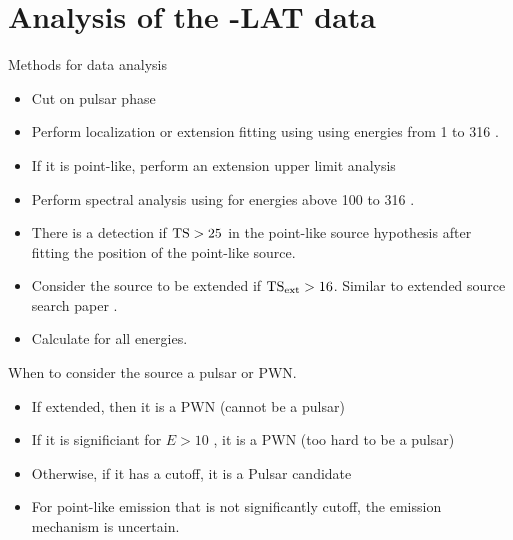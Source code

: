 \section{Analysis of the \fermi-LAT data}


Methods for data analysis
\begin{itemize}
\item Cut on pulsar phase
\item Perform localization or extension fitting using \gtlike using energies from 1 \gev to 316 \gev.
\item If it is point-like, perform an extension upper limit analysis 
\item Perform spectral analysis using \gtlike for energies above 100 \mev to 316 \gev.
\item There is a detection if  $\text{TS}>25$ in the point-like source hypothesis after fitting the position of the point-like source. 
\item Consider the source to be extended if $\text{TS}_\text{ext}>16$. Similar to extended source search paper .
\item Calculate \tscut for all energies.
\end{itemize}

When to consider the source a pulsar or PWN.
\begin{itemize}
  \item If extended, then it is a PWN (cannot be a pulsar)
  \item If it is significiant for $E>10$ \gev, it is a PWN (too hard to be a pulsar)
  \item Otherwise, if it has a cutoff, it is a Pulsar candidate
  \item For point-like emission that is not significantly cutoff, the emission  mechanism is uncertain.
\end{itemize}
